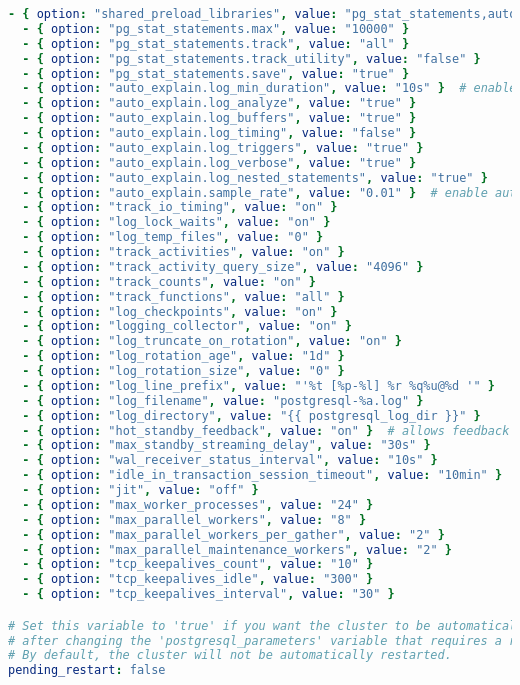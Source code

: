 \begin{flushleft}
\begin{lstlisting}[language=yaml, caption=Testsystem - Deployment - main.yml,captionpos=b,label={lst:testsystem-deployment-main.yml},breaklines=true]
  - { option: "shared_preload_libraries", value: "pg_stat_statements,auto_explain" }
  - { option: "pg_stat_statements.max", value: "10000" }
  - { option: "pg_stat_statements.track", value: "all" }
  - { option: "pg_stat_statements.track_utility", value: "false" }
  - { option: "pg_stat_statements.save", value: "true" }
  - { option: "auto_explain.log_min_duration", value: "10s" }  # enable auto_explain for 10-second logging threshold. Decrease this value if necessary
  - { option: "auto_explain.log_analyze", value: "true" }
  - { option: "auto_explain.log_buffers", value: "true" }
  - { option: "auto_explain.log_timing", value: "false" }
  - { option: "auto_explain.log_triggers", value: "true" }
  - { option: "auto_explain.log_verbose", value: "true" }
  - { option: "auto_explain.log_nested_statements", value: "true" }
  - { option: "auto_explain.sample_rate", value: "0.01" }  # enable auto_explain for 1% of queries logging threshold
  - { option: "track_io_timing", value: "on" }
  - { option: "log_lock_waits", value: "on" }
  - { option: "log_temp_files", value: "0" }
  - { option: "track_activities", value: "on" }
  - { option: "track_activity_query_size", value: "4096" }
  - { option: "track_counts", value: "on" }
  - { option: "track_functions", value: "all" }
  - { option: "log_checkpoints", value: "on" }
  - { option: "logging_collector", value: "on" }
  - { option: "log_truncate_on_rotation", value: "on" }
  - { option: "log_rotation_age", value: "1d" }
  - { option: "log_rotation_size", value: "0" }
  - { option: "log_line_prefix", value: "'%t [%p-%l] %r %q%u@%d '" }
  - { option: "log_filename", value: "postgresql-%a.log" }
  - { option: "log_directory", value: "{{ postgresql_log_dir }}" }
  - { option: "hot_standby_feedback", value: "on" }  # allows feedback from a hot standby to the primary that will avoid query conflicts
  - { option: "max_standby_streaming_delay", value: "30s" }
  - { option: "wal_receiver_status_interval", value: "10s" }
  - { option: "idle_in_transaction_session_timeout", value: "10min" }  # reduce this timeout if possible
  - { option: "jit", value: "off" }
  - { option: "max_worker_processes", value: "24" }
  - { option: "max_parallel_workers", value: "8" }
  - { option: "max_parallel_workers_per_gather", value: "2" }
  - { option: "max_parallel_maintenance_workers", value: "2" }
  - { option: "tcp_keepalives_count", value: "10" }
  - { option: "tcp_keepalives_idle", value: "300" }
  - { option: "tcp_keepalives_interval", value: "30" }

# Set this variable to 'true' if you want the cluster to be automatically restarted
# after changing the 'postgresql_parameters' variable that requires a restart in the 'config_pgcluster.yml' playbook.
# By default, the cluster will not be automatically restarted.
pending_restart: false


\end{lstlisting}
\end{flushleft}
